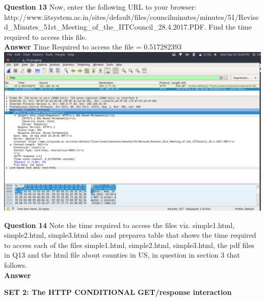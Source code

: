 \documentclass[14pt]{extarticle}
\begin{document}
    \noindent
    \textbf{\large Question 13}
    Now, enter the following URL to your browser: 
    {http://www.iitsystem.ac.in/sites/default/files/councilminutes/minutes/51/Revised\_Minutes\_51st\_Meeting\_of\_the\_IITCouncil\_28.4.2017.PDF}. 
    Find the time required to access this file.\\
    \textbf{\large Answer}
    Time Required to access the file = 0.517282393\\[10pt]
    \includegraphics[scale=0.40]{1_13}
    \vspace{1cm}

    \noindent
    \textbf{\large Question 14}
    Note the time required to access the files viz.  simple1.html, simple2.html, simple3.html also and preparea table that shows the time required to access each of the files simple1.html, simple2.html, simple3.html,
    the pdf files in Q13 and the html file about counties in US, in question in section 3 that follows.\\
    \textbf{\large Answer}
    \vspace{1cm}


    \begin{center}
        {\large \textbf{SET 2: The HTTP CONDITIONAL GET/response interaction }}
    \end{center}
\end{document}
